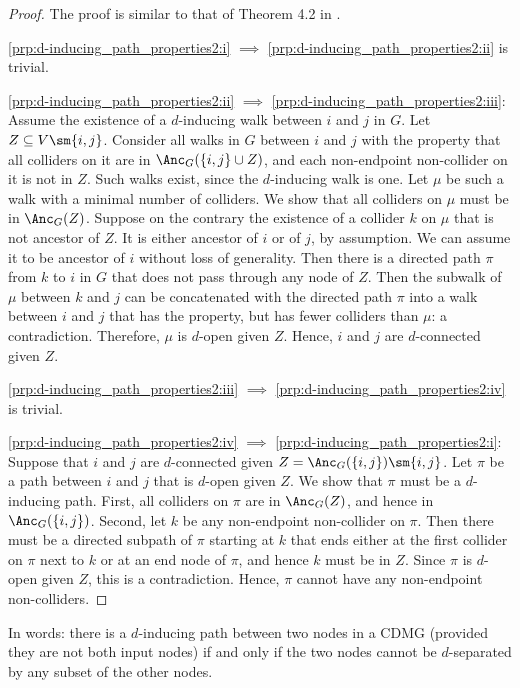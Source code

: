 \begin{proof}
  The proof is similar to that of Theorem 4.2 in \cite{RichardsonSpirtes02}.

  \ref{prp:d-inducing_path_properties2:i} $\implies$ \ref{prp:d-inducing_path_properties2:ii} is trivial.

  \ref{prp:d-inducing_path_properties2:ii} $\implies$ \ref{prp:d-inducing_path_properties2:iii}: Assume the existence of a $d$-inducing walk between $i$ and $j$ in $G$. 
  Let $Z \subseteq V \sm\{i,j\}$. 
  Consider all walks in $G$ between $i$ and $j$ with the property that all colliders on it are in $\Anc_{G}({\{i,j\} \cup Z)}$, and each non-endpoint non-collider on it is not in $Z$.
  Such walks exist, since the $d$-inducing walk is one. 
  Let $\mu$ be such a walk with a minimal number of colliders.
  We show that all colliders on $\mu$ must be in $\Anc_{G}(Z)$. 
  Suppose on the contrary the existence of a collider $k$ on $\mu$ that is not ancestor of $Z$.
  It is either ancestor of $i$ or of $j$, by assumption.
  We can assume it to be ancestor of $i$ without loss of generality.
  Then there is a directed path $\pi$ from $k$ to $i$ in $G$ that does not pass through any node of $Z$.
  Then the subwalk of $\mu$ between $k$ and $j$ can be concatenated with the directed path $\pi$
  into a walk between $i$ and $j$ that has the property, but has fewer colliders than $\mu$: a contradiction. 
  Therefore, $\mu$ is $d$-open given $Z$.
  Hence, $i$ and $j$ are $d$-connected given $Z$.

  \ref{prp:d-inducing_path_properties2:iii} $\implies$ \ref{prp:d-inducing_path_properties2:iv} is trivial.

  \ref{prp:d-inducing_path_properties2:iv} $\implies$ \ref{prp:d-inducing_path_properties2:i}:
  Suppose that %
  $i$ and $j$ are $d$-connected given $Z = \Anc_{G}(\{i,j\}) \sm \{i,j\}$. 
  Let $\pi$ be a path between $i$ and $j$ that is $d$-open given $Z$. %
  We show that $\pi$ must be a $d$-inducing path. 
  First, all colliders on $\pi$ are in $\Anc_G(Z)$, and hence in $\Anc_{G}(\{i,j\})$.
  Second, let $k$ be any non-endpoint non-collider on $\pi$.
  Then there must be a directed subpath of $\pi$ starting at $k$ that ends either at the first collider on $\pi$ next to $k$ or at an end node of $\pi$, and hence $k$ must be in $Z$. 
  Since $\pi$ is $d$-open given $Z$, this is a contradiction.
  Hence, $\pi$ cannot have any non-endpoint non-colliders.
\end{proof}
In words: there is a $d$-inducing path between two nodes in a CDMG (provided they are not both input nodes) if and only if the two nodes cannot be $d$-separated by any subset of the other nodes.
